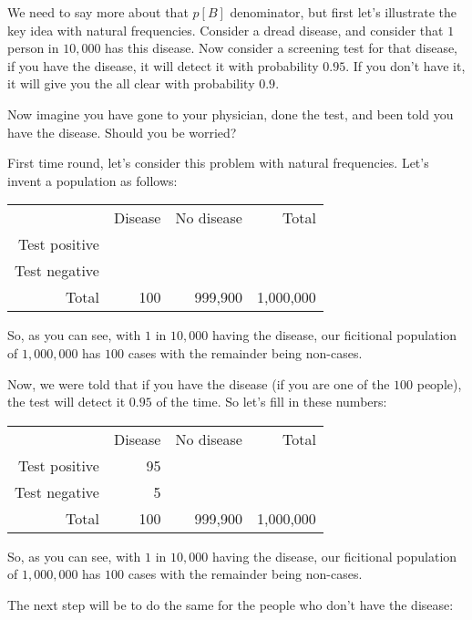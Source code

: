 \documentclass[12pt]{extbook}
\begin{document}
 

We need to say more about that $p[B]$ denominator, but first let's illustrate the key idea with natural frequencies.   Consider a dread disease, and consider that $1$ person in $10,000$ has this disease.   Now consider a screening test for that disease, if you have the disease, it will detect it with probability $0.95$.   If you don't have it, it will give you the all clear with probability $0.9$.   

Now imagine you have gone to your physician, done the test, and been told you have the disease.   Should you be worried?

 

First time round, let's consider this problem with natural frequencies.   Let's invent a population as follows:

\begin{tabular}{rrrr}
 & Disease & No disease & Total \\
Test positive \phantom{95} & \phantom{99,990} & \phantom{100,085} \\
Test negative \phantom{5} & \phantom{899,910} & \phantom{899,915} \\
Total & 100 & 999,900 & 1,000,000
\end{tabular}

So, as you can see, with $1$ in $10,000$ having the disease, our ficitional population of $1,000,000$ has $100$ cases with the remainder being non-cases.

 

Now, we were told that if you have the disease (if you are one of the $100$ people), the test will detect it $0.95$ of the time.   So let's fill in these numbers:

\begin{tabular}{rrrr}
 & Disease & No disease & Total \\
Test positive & 95 & \phantom{99,990} & \phantom{100,085} \\
Test negative & 5 & \phantom{899,910} & \phantom{899,915} \\
Total & 100 & 999,900 & 1,000,000
\end{tabular}

So, as you can see, with $1$ in $10,000$ having the disease, our ficitional population of $1,000,000$ has $100$ cases with the remainder being non-cases.

The next step will be to do the same for the people who don't have the disease:


 
\end{document}
